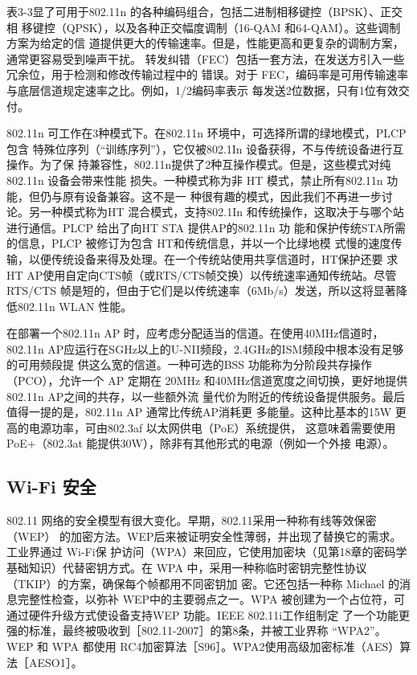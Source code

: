 表3-3显了可用于802.11n 的各种编码组合，包括二进制相移键控（BPSK）、正交相
移键控（QPSK），以及各种正交幅度调制（16-QAM 和64-QAM）。这些调制方案为给定的信
道提供更大的传输速率。但是，性能更高和更复杂的调制方案，通常更容易受到噪声干扰。
转发纠错（FEC）包括一套方法，在发送方引入一些冗余位，用于检测和修改传输过程中的
错误。对于 FEC，编码率是可用传输速率与底层信道规定速率之比。例如，1/2编码率表示
每发送2位数据，只有1位有效交付。

802.11n 可工作在3种模式下。在802.11n 环境中，可选择所谓的绿地模式，PLCP包含
特殊位序列（“训练序列”），它仅被802.1In 设备获得，不与传统设备进行互操作。为了保
持兼容性，802.11n提供了2种互操作模式。但是，这些模式对纯802.11n 设备会带来性能
损失。一种模式称为非 HT 模式，禁止所有802.11n 功能，但仍与原有设备兼容。这不是一
种很有趣的模式，因此我们不再进一步讨论。另一种模式称为HT 混合模式，支持802.1In
和传统操作，这取决于与哪个站进行通信。PLCP 给出了向HT STA 提供AP的802.11n 功
能和保护传统STA所需的信息，PLCP 被修订为包含 HT和传统信息，并以一个比绿地模
式慢的速度传输，以便传统设备来得及处理。在一个传统站使用共享信道时，HT保护还要
求 HT AP使用自定向CTS帧（或RTS/CTS帧交换）以传统速率通知传统站。尽管 RTS/CTS
帧是短的，但由于它们是以传统速率（6Mb/s）发送，所以这将显著降低802.11n WLAN
性能。

在部署一个802.11n AP 时，应考虑分配适当的信道。在使用40MHz信道时，802.11n
AP应运行在SGHz以上的U-NII频段，2.4GHz的ISM频段中根本没有足够的可用频段提
供这么宽的信道。一种可选的BSS 功能称为分阶段共存操作（PCO），允许一个 AP 定期在
20MHz 和40MHz信道宽度之间切换，更好地提供802.11n AP之间的共存，以一些额外流
量代价为附近的传统设备提供服务。最后值得一提的是，802.11n AP 通常比传统AP消耗更
多能量。这种比基本的15W 更高的电源功率，可由802.3af 以太网供电（PoE）系统提供，
这意味着需要使用 PoE+（802.3at 能提供30W），除非有其他形式的电源（例如一个外接
电源）。

\subsection{Wi-Fi 安全}

802.11 网络的安全模型有很大变化。早期，802.11采用一种称有线等效保密（WEP）
的加密方法。WEP后来被证明安全性薄弱，并出现了替换它的需求。工业界通过 Wi-Fi保
护访问（WPA）来回应，它使用加密块（见第18章的密码学基础知识）代替密钥方式。在
WPA 中，采用一种称临时密钥完整性协议（TKIP）的方案，确保每个帧都用不同密钥加
密。它还包括一种称 Michael 的消息完整性检查，以弥补 WEP中的主要弱点之一。WPA
被创建为一个占位符，可通过硬件升级方式使设备支持WEP 功能。IEEE 802.11i工作组制定
了一个功能更强的标准，最终被吸收到［802.11-2007］的第8条，并被工业界称 “WPA2”。
WEP 和 WPA 都使用 RC4加密算法［S96］。WPA2使用高级加密标准（AES）算法［AESO1］。

